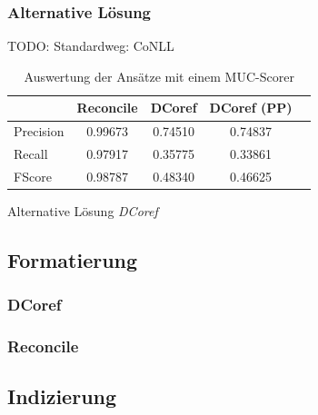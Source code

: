 \documentclass[a4paper,12pt,titlepage=true, ngerman]{scrartcl}
\begin{document}

\subsubsection{Alternative Lösung}%

TODO: Standardweg: CoNLL

\begin{table}[ht]
\begin{center}
  \begin{tabular}{ l || c | c | c ||  r }
				& Reconcile 	& DCoref 	& DCoref (PP) 	& \\ \hline \hline
    	Precision 	& 0.99673 	& 0.74510	& 0.74837		& \\ \hline
    	Recall     	& 0.97917 	& 0.35775 	& 0.33861 		& \\ \hline
    	FScore    	& 0.98787  	& 0.48340 	& 0.46625 		& \\ \hline
  \end{tabular}
  \caption{Auswertung der Ansätze mit einem MUC-Scorer}
  \label{score:ergebnis}
  \end{center}
\end{table}

Alternative Lösung \emph{DCoref} \autocite[S. 385 f.]{chris_haghighi}



\subsection{Formatierung}%



\subsubsection{DCoref}%



\subsubsection{Reconcile}%


\subsection{Indizierung}%
\end{document}
